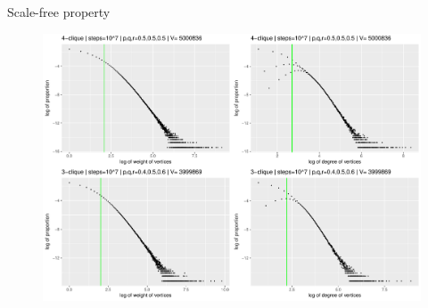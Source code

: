 \begin{block}{Scale-free property}
\begin{figure}                  
\includegraphics[width=0.8\linewidth]{./fig/klikkdist4.pdf}
\end{figure}
\end{block}
